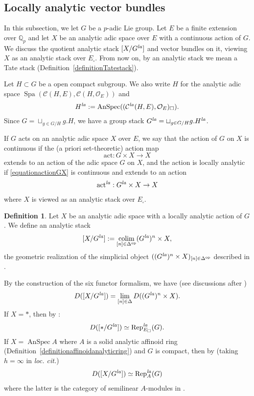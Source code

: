 \documentclass[a4paper,10pt]{amsart}
\theoremstyle{remark}
\theoremstyle{definition}
\newtheorem{definition}[theorem]{Definition}
\theoremstyle{plain}
\numberwithin{equation}{section}
\newcommand{\bbQ}{{\mathbb Q}}
\newcommand{\calC}{{\mathcal C}}
\newcommand{\calO}{{\mathcal O}}
\newcommand{\la}{{\it la}}
\newcommand{\Rep}{{\rm Rep}}
\DeclareMathOperator{\Spa}{Spa}
\DeclareMathOperator{\colim}{colim}
\DeclareMathOperator{\AnSpec}{AnSpec}
\begin{document}
\subsection{Locally analytic vector bundles}\label{subsectionquotientstacks}
In this subsection, we let $G$ be a $p$-adic Lie group. Let $E$ be a finite extension over $\bbQ_p$ and let $X$ be an analytic adic space over $E$ with a continuous action of $G$. We discuss the quotient analytic stack $[X/G^{\la}]$ and vector bundles on it, viewing $X$ as an analytic stack over $E_{\square}$. From now on, by an analytic stack we mean a Tate stack (Definition~\ref{definitionTatestack}).

Let $H\subset G$ be a open compact subgroup. We also write $H$ for the analytic adic space $\Spa(\calC(H,E),\calC(H,\calO_E))$ and 
\[H^{\la}:=\AnSpec((\calC^{\la}(H,E),\calO_E)_{\square}).\] 
Since $G=\sqcup_{g\in G/H}g.H$, we have a group stack $G^{\la}=\sqcup_{g\in G/H}g.H^{\la}$. 

If $G$ acts on an analytic adic space $X$ over $E$, we say that the action of $G$ on $X$ is continuous if the (a priori set-theoretic) action map 
\begin{equation}\label{equationactionGX}
	\mathrm{act}:G\times X\rightarrow X
\end{equation}
extends to an action of the adic space $G$ on $X$, and the action is locally analytic if \eqref{equationactionGX} is continuous and extends to an action 
\begin{equation}\label{equation}
	\mathrm{act}^{\la}:G^{\la}\times X\to X
\end{equation}
where $X$ is viewed as an analytic stack over $E_{\square}$. 
\begin{definition}\label{definitionquotientstack}
	Let $X$ be an analytic adic space with a locally analytic action of $G$. We define an analytic stack
	\[[X/G^{\la}]:=\colim_{[n]\in \Delta^{\rm op}} (G^{\la})^n\times X,\]
	the geometric realization of the simplicial object $((G^{\la})^n\times X)_{[n]\in \Delta^{\rm op}}$ described in \cite[Def.~4.3.1]{JC23}.
\end{definition}
By the construction of the six functor formalism, we have (see discussions after \cite[Exam.~3.4.5]{heyer20246functor})
\begin{equation}\label{equationDXG}
	D([X/G^{\la}])=\lim_{[n]\in \Delta}D((G^{\la})^n\times X).
\end{equation}
If $X=*$, then by \cite[Thm.~4.3.3]{JC23}: 
\begin{equation}\label{equationstackrepresentation}
	D([*/G^{\la}])\simeq \Rep^{\la}_{E_\square}(G).
\end{equation} 
If $X=\AnSpec A$ where $A$ is a solid analytic affinoid ring (Definition~\ref{definitionaffinoidanalyticring}) and $G$ is compact, then by \cite[Prop.~2.47]{mikami2026finiteness} (taking $h=\infty$ in \textit{loc. cit.})
\[D([X/G^{\la}])\simeq \mathrm{Rep}_A^{\la}(G)\]
where the latter is the category of semilinear $A$-modules in \cite[Def.~2.46]{mikami2026finiteness}.
\end{document}
